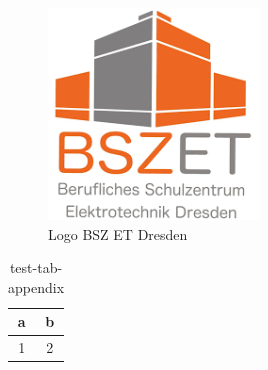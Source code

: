 \documentclass[a4paper,
    11pt,
    headings=small,
    ngerman,
    listof=totoc,
    index=totoc,
    numbers=noenddot]{scrreprt}[2021/11/13]
\begin{document}
\begin{figure}[htbp]
  \centering
  \includegraphics[width=0.5\textwidth]{pics/bszet.png}
  \caption{Logo BSZ ET Dresden}
  \label{fig:logobszetddappendix}
\end{figure}

\begin{table}[h]
  \caption{test-tab-appendix}
  \noindent
  \centering
  \begin{tabular}{|c|c|}
    \hline
    a & b\tabularnewline
    \hline\hline
    1 & 2\tabularnewline
    \hline
  \end{tabular}
\end{table}

\newpage
\listofalofs

\newpage

\listofalots

\newpage


\end{document}
